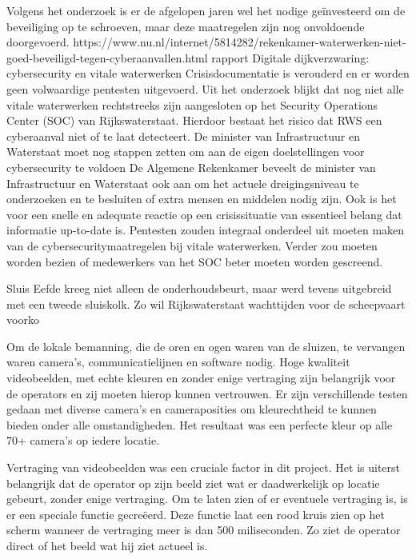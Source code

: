 Volgens het onderzoek is er de afgelopen jaren wel het nodige geïnvesteerd om de beveiliging op te schroeven, maar deze maatregelen zijn nog onvoldoende doorgevoerd.
https://www.nu.nl/internet/5814282/rekenkamer-waterwerken-niet-goed-beveiligd-tegen-cyberaanvallen.html
\cite{hdsr30092022lichtprojectieswaterliniesluizen}
rapport Digitale dijkverzwaring: cybersecurity en vitale waterwerken 
Crisisdocumentatie is verouderd en er worden geen volwaardige pentesten uitgevoerd. Uit het onderzoek blijkt dat nog niet alle vitale waterwerken rechtstreeks zijn aangesloten op het Security Operations Center (SOC) van Rijkswaterstaat. Hierdoor bestaat het risico dat RWS een cyberaanval niet of te laat detecteert. De minister van Infrastructuur en Waterstaat moet nog stappen zetten om aan de eigen doelstellingen voor cybersecurity te voldoen
De Algemene Rekenkamer beveelt de minister van Infrastructuur en Waterstaat ook aan om het actuele dreigingsniveau te onderzoeken en te besluiten of extra mensen en middelen nodig zijn. Ook is het voor een snelle en adequate reactie op een crisissituatie van essentieel belang dat informatie up-to-date is. Pentesten zouden integraal onderdeel uit moeten maken van de cybersecuritymaatregelen bij vitale waterwerken. Verder zou moeten worden bezien of medewerkers van het SOC beter moeten worden gescreend.

\cite{kramerZeeland}
Sluis Eefde kreeg niet alleen de onderhoudsbeurt, maar werd tevens uitgebreid met een tweede sluiskolk. Zo wil Rijkswaterstaat wachttijden voor de scheepvaart voorko

\cite{gww29032021kantelendesluisdeur}
Om de lokale bemanning, die de oren en ogen waren van de sluizen, te vervangen waren camera’s, communicatielijnen en software nodig. Hoge kwaliteit videobeelden, met echte kleuren en zonder enige vertraging zijn belangrijk voor de operators en zij moeten hierop kunnen vertrouwen. Er zijn verschillende testen gedaan met diverse camera’s en cameraposities om kleurechtheid te kunnen bieden onder alle omstandigheden. Het resultaat was een perfecte kleur op alle 70+ camera’s op iedere locatie.

Vertraging van videobeelden was een cruciale factor in dit project. Het is uiterst belangrijk dat de operator op zijn beeld ziet wat er daadwerkelijk op locatie gebeurt, zonder enige vertraging. Om te laten zien of er eventuele vertraging is, is er een speciale functie gecreëerd. Deze functie laat een rood kruis zien op het scherm wanneer de vertraging meer is dan 500 miliseconden. Zo ziet de operator direct of het beeld wat hij ziet actueel is. 

